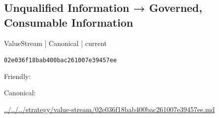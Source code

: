 \documentclass[10pt,a4paper]{article}
\begin{document}
\subsection*{Unqualified Information → Governed, Consumable Information}
{\small ValueStream | Canonical | current}\par
\texttt{02e036f18bab400bac261007e39457ee}\par
Friendly: \par
Canonical: \par
{\footnotesize\url{../../../strategy/value-stream/02e036f18bab400bac261007e39457ee.md}}\par
\end{document}
